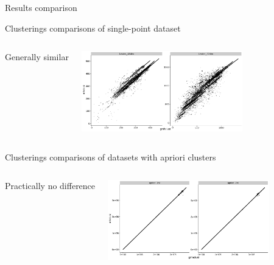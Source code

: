\documentclass[10pt]{beamer}
\begin{document}
\begin{frame}{Results comparison}
	
	\begin{block}{Clusterings comparisons of single-point dataset}
		
		\begin{columns}
			\column{\linewidth-7cm}
			
			Generally similar
			
			\column{7cm}
			\includegraphics[width=7cm]{img/single_result}
			
		\end{columns}
	\end{block}
	
	\begin{block}{Clusterings comparisons of datasets with apriori clusters}
		\begin{columns}
			\column{\linewidth-7cm}
			
			
			Practically no difference
			
			\column{7cm}
			\includegraphics[width=7cm]{../img/apriori_result}
			
		\end{columns}
	\end{block}
	
\end{frame}
\end{document}
